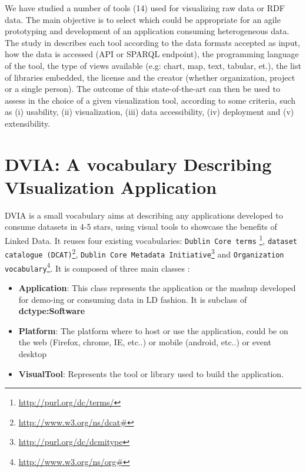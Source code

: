 \documentclass[a4paper,11pt]{report}
\begin{document}
We have studied a number of tools (14) used for visualizing raw data or RDF data. The main objective is to select which could be appropriate for an agile prototyping and development of an application consuming heterogeneous data. 
The study in \cite{deliverable2012b} describes each tool according to the data formats accepted as input, how the data is accessed (API or SPARQL endpoint), the programming language of the tool, the type of views available (e.g: chart, map, text, tabular, et.), the list of libraries embedded, the license and the creator (whether organization, project or a single person). The outcome of this state-of-the-art can then be used to assess in the choice of a given visualization tool, according to some criteria, such as (i) usability, (ii) visualization, (iii) data accessibility, (iv) deployment and (v) extensibility. 



\section{DVIA: A vocabulary   Describing VIsualization Application}
DVIA is a small vocabulary aims at describing any applications developed to consume datasets in 4-5 stars, using visual tools to showcase the benefits of Linked Data. It reuses four existing vocabularies: \texttt{Dublin Core terms} \footnote{\url{http://purl.org/dc/terms/}}, \texttt{dataset catalogue (DCAT)}\footnote{\url{http://www.w3.org/ns/dcat#}}, \texttt{Dublin Core Metadata Initiative}\footnote{\url{http://purl.org/dc/dcmitype}} and \texttt{Organization vocabulary}\footnote{\url{http://www.w3.org/ns/org#}}.  It is composed of three main classes : 

\begin{itemize}
\item \textbf{Application}: This class represents the application or the mashup developed for demo-ing or consuming data in LD fashion. It is subclass of \textbf{dctype:Software}
\item \textbf{Platform}: The platform where to host or use the application, could be on the web (Firefox, chrome, IE, etc..) or mobile (android, etc..) or event desktop
\item \textbf{VisualTool}: Represents the tool or library used to build the application. 
\end{itemize}
\end{document}
